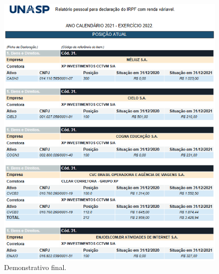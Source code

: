 
\begin{figure}[h]
    \caption{\label{fig:Fig_6}Demonstrativo final.}
    \begin{center}
    \includegraphics[width=\textwidth]{TCC_Renda/figuras/resultado final.eps}
    \end{center}
\end{figure}

